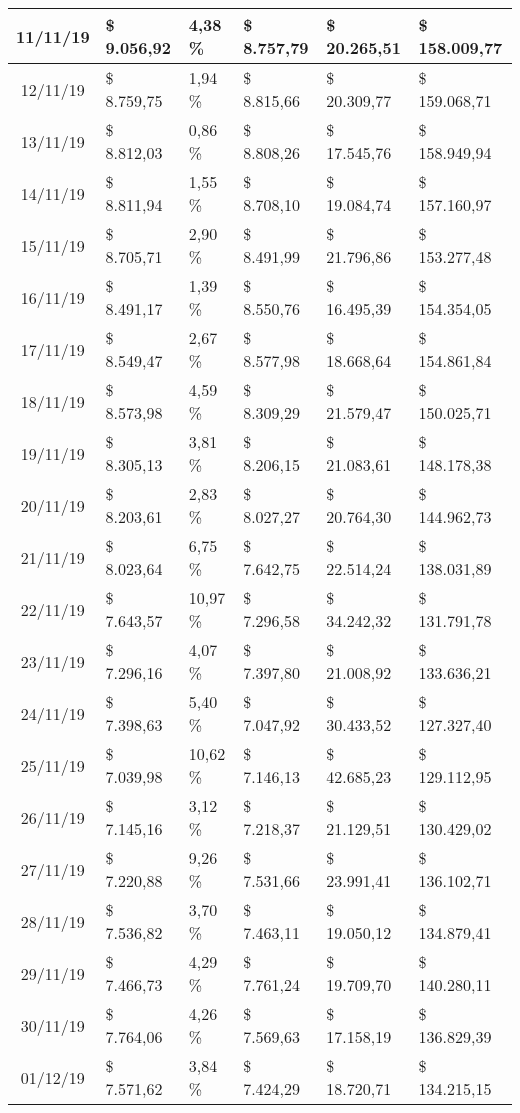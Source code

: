 \begin{small}
\begin{longtable}{|c|l|l|l|l|l|}
11/11/19 & \$ 9.056,92 & 4,38 \% & \$ 8.757,79 & \$ 20.265,51 & \$ 158.009,77 \\ \hline
12/11/19 & \$ 8.759,75 & 1,94 \% & \$ 8.815,66 & \$ 20.309,77 & \$ 159.068,71 \\ \hline
13/11/19 & \$ 8.812,03 & 0,86 \% & \$ 8.808,26 & \$ 17.545,76 & \$ 158.949,94 \\ \hline
14/11/19 & \$ 8.811,94 & 1,55 \% & \$ 8.708,10 & \$ 19.084,74 & \$ 157.160,97 \\ \hline
15/11/19 & \$ 8.705,71 & 2,90 \% & \$ 8.491,99 & \$ 21.796,86 & \$ 153.277,48 \\ \hline
16/11/19 & \$ 8.491,17 & 1,39 \% & \$ 8.550,76 & \$ 16.495,39 & \$ 154.354,05 \\ \hline
17/11/19 & \$ 8.549,47 & 2,67 \% & \$ 8.577,98 & \$ 18.668,64 & \$ 154.861,84 \\ \hline
18/11/19 & \$ 8.573,98 & 4,59 \% & \$ 8.309,29 & \$ 21.579,47 & \$ 150.025,71 \\ \hline
19/11/19 & \$ 8.305,13 & 3,81 \% & \$ 8.206,15 & \$ 21.083,61 & \$ 148.178,38 \\ \hline
20/11/19 & \$ 8.203,61 & 2,83 \% & \$ 8.027,27 & \$ 20.764,30 & \$ 144.962,73 \\ \hline
21/11/19 & \$ 8.023,64 & 6,75 \% & \$ 7.642,75 & \$ 22.514,24 & \$ 138.031,89 \\ \hline
22/11/19 & \$ 7.643,57 & 10,97 \% & \$ 7.296,58 & \$ 34.242,32 & \$ 131.791,78 \\ \hline
23/11/19 & \$ 7.296,16 & 4,07 \% & \$ 7.397,80 & \$ 21.008,92 & \$ 133.636,21 \\ \hline
24/11/19 & \$ 7.398,63 & 5,40 \% & \$ 7.047,92 & \$ 30.433,52 & \$ 127.327,40 \\ \hline
25/11/19 & \$ 7.039,98 & 10,62 \% & \$ 7.146,13 & \$ 42.685,23 & \$ 129.112,95 \\ \hline
26/11/19 & \$ 7.145,16 & 3,12 \% & \$ 7.218,37 & \$ 21.129,51 & \$ 130.429,02 \\ \hline
27/11/19 & \$ 7.220,88 & 9,26 \% & \$ 7.531,66 & \$ 23.991,41 & \$ 136.102,71 \\ \hline
28/11/19 & \$ 7.536,82 & 3,70 \% & \$ 7.463,11 & \$ 19.050,12 & \$ 134.879,41 \\ \hline
29/11/19 & \$ 7.466,73 & 4,29 \% & \$ 7.761,24 & \$ 19.709,70 & \$ 140.280,11 \\ \hline
30/11/19 & \$ 7.764,06 & 4,26 \% & \$ 7.569,63 & \$ 17.158,19 & \$ 136.829,39 \\ \hline
01/12/19 & \$ 7.571,62 & 3,84 \% & \$ 7.424,29 & \$ 18.720,71 & \$ 134.215,15 \\ \hline

\end{longtable}
\end{small}
